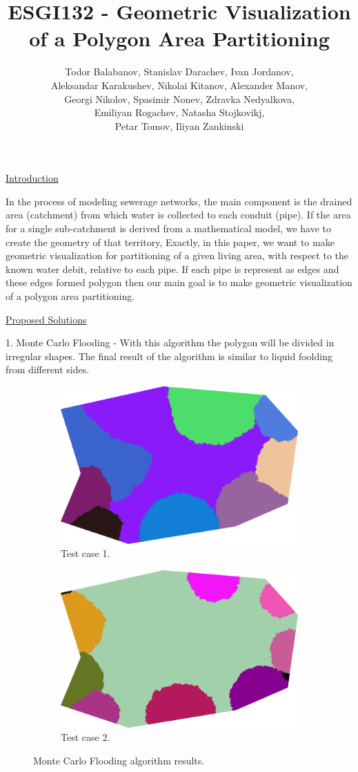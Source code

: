\documentclass{article}
\title{ESGI132 - Geometric Visualization of a Polygon Area Partitioning}
\author{Todor Balabanov, Stanislav Darachev, Ivan Jordanov,\\
Aleksandar Karakushev, Nikolai Kitanov, Alexander Manov,\\
Georgi Nikolov, Spasimir Nonev, Zdravka Nedyalkova,\\
Emiliyan Rogachev, Natasha Stojkovikj,\\
Petar Tomov, Iliyan Zankinski}
\begin{document}
%
\maketitle

\underline{Introduction}
\vspace*{3mm}

In the process of modeling sewerage networks, the main component is the drained area (catchment) from which water is collected to each conduit (pipe). If the area for a single sub-catchment is derived from a mathematical model, we have to create the geometry of that territory, Exactly, in this paper, we want to make geometric visualization for partitioning of a given living area, with respect to the known water debit, relative to each pipe. If each pipe is represent as edges and these edges formed polygon  then our main goal is to make geometric visualization of a polygon area partitioning.
\vspace*{3mm}

\underline{Proposed Solutions}
\vspace*{3mm}

1. Monte Carlo Flooding - With this algorithm the polygon will be divided in irregular shapes. The final result of the algorithm is similar to liquid foolding from different sides.
\begin{figure}[h!]
\centering
\begin{subfigure}{.5\textwidth}
  \centering
  \includegraphics[width=.5\linewidth]{pic08.png}
  \caption{Test case 1.}
  \label{fig:sub7}
\end{subfigure}%
\begin{subfigure}{.5\textwidth}
  \centering
  \includegraphics[width=.5\linewidth]{pic09.png}
  \caption{Test case 2.}
  \label{fig:sub8}
\end{subfigure}
\caption{Monte Carlo Flooding algorithm results.}
\label{fig:five}
\end{figure}
\end{document}
